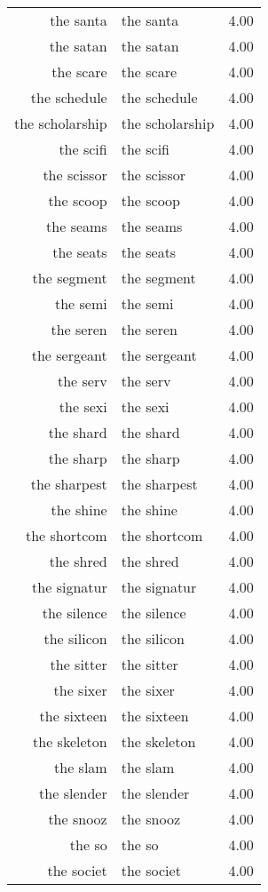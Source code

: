 \begin{table}[ht]
\begin{tabular}{rlr}
  the santa & the santa & 4.00 \\ 
  the satan & the satan & 4.00 \\ 
  the scare & the scare & 4.00 \\ 
  the schedule & the schedule & 4.00 \\ 
  the scholarship & the scholarship & 4.00 \\ 
  the scifi & the scifi & 4.00 \\ 
  the scissor & the scissor & 4.00 \\ 
  the scoop & the scoop & 4.00 \\ 
  the seams & the seams & 4.00 \\ 
  the seats & the seats & 4.00 \\ 
  the segment & the segment & 4.00 \\ 
  the semi & the semi & 4.00 \\ 
  the seren & the seren & 4.00 \\ 
  the sergeant & the sergeant & 4.00 \\ 
  the serv & the serv & 4.00 \\ 
  the sexi & the sexi & 4.00 \\ 
  the shard & the shard & 4.00 \\ 
  the sharp & the sharp & 4.00 \\ 
  the sharpest & the sharpest & 4.00 \\ 
  the shine & the shine & 4.00 \\ 
  the shortcom & the shortcom & 4.00 \\ 
  the shred & the shred & 4.00 \\ 
  the signatur & the signatur & 4.00 \\ 
  the silence & the silence & 4.00 \\ 
  the silicon & the silicon & 4.00 \\ 
  the sitter & the sitter & 4.00 \\ 
  the sixer & the sixer & 4.00 \\ 
  the sixteen & the sixteen & 4.00 \\ 
  the skeleton & the skeleton & 4.00 \\ 
  the slam & the slam & 4.00 \\ 
  the slender & the slender & 4.00 \\ 
  the snooz & the snooz & 4.00 \\ 
  the so & the so & 4.00 \\ 
  the societ & the societ & 4.00 \\ 

\end{tabular}
\end{table}
